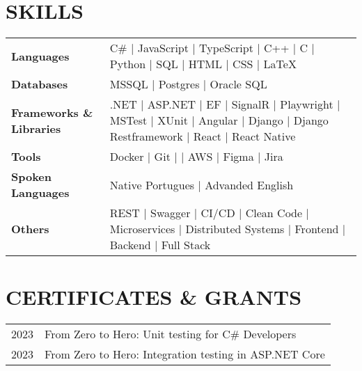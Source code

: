 \documentclass[letterpaper,11pt]{article}
\begin{document}

\section{SKILLS}

\begin{table}[htbp]
    \begin{tabularx}{\textwidth}{@{}lX@{}}
        \textbf{Languages} & C\# $\vert$ JavaScript $\vert$ TypeScript $\vert$ C++ $\vert$ C $\vert$ Python $\vert$ SQL $\vert$ HTML $\vert$ CSS $\vert$ \LaTeX \\
        \textbf{Databases} & MSSQL $\vert$ Postgres $\vert$ Oracle SQL \\
        \textbf{Frameworks \& Libraries} & .NET $\vert$ ASP.NET $\vert$ EF $\vert$ SignalR $\vert$ Playwright $\vert$ MSTest $\vert$ XUnit $\vert$ Angular $\vert$ Django $\vert$ Django Restframework $\vert$ React $\vert$ React Native \\
        \textbf{Tools} & Docker $\vert$ Git $\vert$ $\vert$ AWS $\vert$ Figma $\vert$ Jira \\
        \textbf{Spoken Languages} & Native Portugues $\vert$ Advanded English \\
        \textbf{Others} & REST $\vert$ Swagger $\vert$ CI/CD $\vert$ Clean Code $\vert$ Microservices $\vert$ Distributed Systems $\vert$ Frontend $\vert$ Backend $\vert$ Full Stack \\
    \end{tabularx}
\end{table}

\section{CERTIFICATES \& GRANTS}
{
    \begin{tabularx}{\textwidth}{@{}lX@{}}
        2023 & From Zero to Hero: Unit testing for C\# Developers \\
        2023 & From Zero to Hero: Integration testing in ASP.NET Core \\
    \end{tabularx}
}
\end{document}
